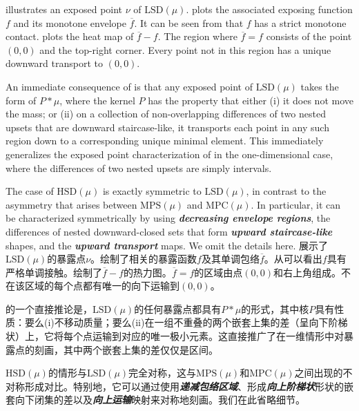 \documentclass[12pt,letterpaper]{article}
\newenvironment{original}{\color{black}}{}
\newenvironment{translation}{\color{blue}}{}
\theoremstyle{plain}
\theoremstyle{definition}
\theoremstyle{remark}
\theoremstyle{definition}
\begin{document}
\begin{original}
 illustrates an exposed point $\nu$ of $\text{LSD}(\mu)$.  plots the associated exposing function $f$ and its monotone envelope $\overline{f}$. It can be seen from  that $f$ has a strict monotone contact.  plots the heat map of $\overline{f}-f$. The region where $\overline{f}=f$ consists of the point $(0,0)$ and the top-right corner. Every point not in this region has a unique downward transport to $(0,0)$.

An immediate consequence of  is that any exposed point of $\text{LSD}(\mu)$ takes the form of $P*\mu$, where the kernel $P$ has the property that either (i) it does not move the mass; or (ii) on a collection of non-overlapping differences of two nested upsets that are downward staircase-like, it transports each point in any such region down to a corresponding unique minimal element. This immediately generalizes the exposed point characterization of \citet{yang2024monotone} in the one-dimensional case, where the differences of two nested upsets are simply intervals.

The case of $\text{HSD}(\mu)$ is exactly symmetric to $\text{LSD}(\mu)$, in contrast to the asymmetry that arises between $\text{MPS}(\mu)$ and $\text{MPC}(\mu)$. In particular, it can be characterized symmetrically by using \textit{\textbf{decreasing envelope regions}}, the differences of nested downward-closed sets that form \textit{\textbf{upward staircase-like}} shapes, and the \textit{\textbf{upward transport}} maps. We omit the details here.
\end{original}
\begin{translation}
展示了$\text{LSD}(\mu)$的暴露点$\nu$。绘制了相关的暴露函数$f$及其单调包络$\overline{f}$。从可以看出$f$具有严格单调接触。绘制了$\overline{f}-f$的热力图。$\overline{f}=f$的区域由点$(0,0)$和右上角组成。不在该区域的每个点都有唯一的向下运输到$(0,0)$。

的一个直接推论是，$\text{LSD}(\mu)$的任何暴露点都具有$P*\mu$的形式，其中核$P$具有性质：要么(i)不移动质量；要么(ii)在一组不重叠的两个嵌套上集的差（呈向下阶梯状）上，它将每个点运输到对应的唯一极小元素。这直接推广了\citet{yang2024monotone}在一维情形中对暴露点的刻画，其中两个嵌套上集的差仅仅是区间。

$\text{HSD}(\mu)$的情形与$\text{LSD}(\mu)$完全对称，这与$\text{MPS}(\mu)$和$\text{MPC}(\mu)$之间出现的不对称形成对比。特别地，它可以通过使用\textit{\textbf{递减包络区域}}、形成\textit{\textbf{向上阶梯状}}形状的嵌套向下闭集的差以及\textit{\textbf{向上运输}}映射来对称地刻画。我们在此省略细节。
\end{translation}
\end{document}
